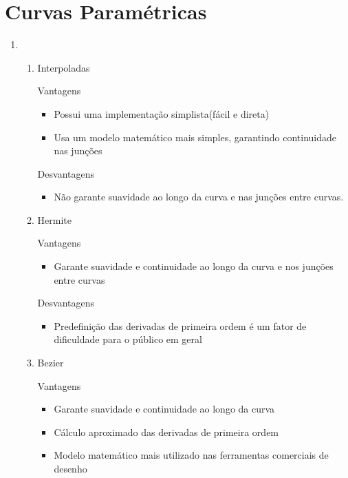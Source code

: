 \section*{Curvas Paramétricas}

	\begin{enumerate}\addtocounter{enumi}{9}
	
	 \item 	\begin{enumerate}[label=\alph*)]
			\item Interpoladas
	
		Vantagens
		\begin{itemize}
			\item Possui uma implementação simplista(fácil e direta)
			
			\item Usa um modelo matemático mais simples, garantindo 
			continuidade nas junções 
		\end{itemize}				
		
		Desvantagens
		\begin{itemize}
			\item Não garante suavidade ao longo da curva e 
		nas junções entre curvas.
		\end{itemize}				

		\item Hermite 
		
		Vantagens
		\begin{itemize}
			\item Garante suavidade e continuidade ao longo da curva
			e nos junções entre curvas
		\end{itemize}				
		
		Desvantagens
		
		\begin{itemize}
			\item Predefinição das derivadas de primeira
			ordem é um fator de dificuldade para o 
			público em geral
		\end{itemize}			
		
		\item Bezier
		
		Vantagens
		\begin{itemize}
			\item Garante suavidade e continuidade ao longo da curva
			
			\item Cálculo aproximado das derivadas de primeira ordem 
			
			\item Modelo matemático mais utilizado nas ferramentas
			comerciais de desenho
		\end{itemize}				
		

\end{enumerate}
\end{enumerate}
